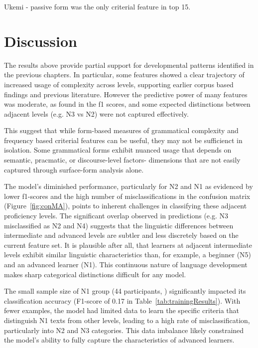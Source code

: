 Ukemi - passive form was the only criterial feature in top 15.


\section{Discussion}

The results above provide partial support for developmental patterns identified in the previous chapters. In
particular, some features showed a clear trajectory of increased usage of complexity across levels, supporting
earlier corpus based findings and previous literature. However the predictive power of many features was moderate,
as found in the f1 scores, and some expected distinctions between adjacent levels (e.g. N3 vs N2) were not captured
effectively.

This suggest that while form-based measures of grammatical complexity and frequency based criterial features can be
useful, they may not be sufficienct in isolation. Some grammatical forms exhibit nuanced usage that depends on
semantic, pracmatic, or discourse-level factors- dimensions that are not easily captured through surface-form
analysis alone.

The model's diminished performance, particularly for N2 and N1 as evidenced by lower f1-scores and the high number
of misclassifications in the confusion matrix (Figure~\ref{fig:conMA}), points to inherent challenges in
classifying these adjacent proficiency levels. The significant overlap observed in predictions (e.g. N3 misclassified
as N2 and N4) suggests that the linguistic differences between intermediate and advanced levels are subtler and less
discretely based on the current feature set. It is plausible after all, that learners at adjacent intermediate
levels exhibit similar linguistic characteristics than, for example, a beginner (N5) and an advanced learner (N1).
This continuous nature of language development makes sharp categorical distinctions difficult for any model.

The small sample size of N1 group (44 participants, ) significantly impacted its classification accuracy (F1-score
of 0.17 in Table~\ref{tab:trainingResults}). With fewer examples, the model had limited data to learn the specific
criteria that distinguish N1 texts from other levels, leading to a high rate of misclassification, particularly into
N2 and N3 categories. This data imbalance likely constrained the model's ability to fully capture the
characteristics of advanced learners.




